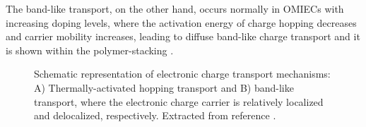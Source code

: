 The band-like transport, on the other hand, occurs normally in OMIECs with increasing doping levels, where the activation energy of charge hopping decreases and carrier mobility increases, leading to diffuse band-like charge transport and it is shown within the polymer-stacking \cite{wangHoppingTransportHall2012}.


\begin{figure}[h]
	\centering
	\hspace{2em}
	\caption[Electronic transport mechanisms in OMIECs]{Schematic representation of electronic charge transport mechanisms: A) Thermally-activated hopping transport %
	and B) band-like transport, %
	where the electronic charge carrier is relatively localized and delocalized, respectively. Extracted from reference \cite{paulsenOrganicMixedIonic2020}.} 
	\label{fig:etrans}
\end{figure}


